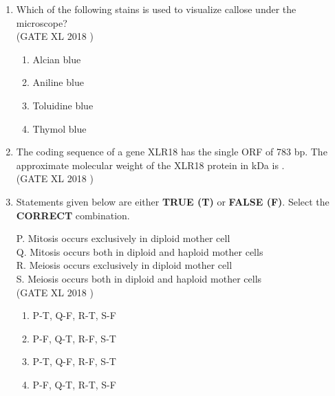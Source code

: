 \documentclass[14pt]{extarticle}
\begin{document}
\begin{flushleft}
\begin{enumerate}[leftmargin=*]
    \item Which of the following stains is used to visualize callose under the microscope?\\
    \hfill(GATE XL 2018 )
    \begin{multicols}{2}
    \begin{enumerate}[label=(\Alph*)]
        \item Alcian blue
        \item Aniline blue
        \item Toluidine blue
        \item Thymol blue
    \end{enumerate}
    \end{multicols}

    \item The coding sequence of a gene XLR18 has the single ORF of 783 bp. The approximate molecular weight of the XLR18 protein in kDa is \underline{\hspace{3cm}}.\\
    \hfill(GATE XL 2018 )

    \item Statements given below are either \textbf{TRUE (T)} or \textbf{FALSE (F)}. Select the \textbf{CORRECT} combination.  

    P. Mitosis occurs exclusively in diploid mother cell \\
    Q. Mitosis occurs both in diploid and haploid mother cells \\
    R. Meiosis occurs exclusively in diploid mother cell \\
    S. Meiosis occurs both in diploid and haploid mother cells\\
    \hfill(GATE XL 2018 )
    \begin{multicols}{2}
    \begin{enumerate}[label=(\Alph*)]
        \item P-T, Q-F, R-T, S-F
        \item P-F, Q-T, R-F, S-T
        \item P-T, Q-F, R-F, S-T
        \item P-F, Q-T, R-T, S-F
    \end{enumerate}
    \end{multicols}


\end{enumerate}
\end{flushleft}
\end{document}
